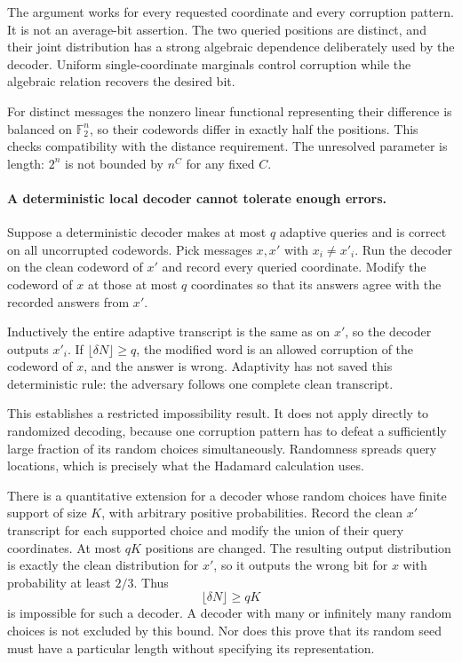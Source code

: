 \documentclass[11pt]{article}
\begin{document}
The argument works for every requested coordinate and every corruption pattern. It is not an average-bit assertion. The two queried positions are distinct, and their joint distribution has a strong algebraic dependence deliberately used by the decoder. Uniform single-coordinate marginals control corruption while the algebraic relation recovers the desired bit.

For distinct messages the nonzero linear functional representing their difference is balanced on $\mathbb F_2^n$, so their codewords differ in exactly half the positions. This checks compatibility with the distance requirement. The unresolved parameter is length: $2^n$ is not bounded by $n^C$ for any fixed $C$.

\paragraph{A deterministic local decoder cannot tolerate enough errors.}
Suppose a deterministic decoder makes at most $q$ adaptive queries and is correct on all uncorrupted codewords. Pick messages $x,x'$ with $x_i\ne x'_i$. Run the decoder on the clean codeword of $x'$ and record every queried coordinate. Modify the codeword of $x$ at those at most $q$ coordinates so that its answers agree with the recorded answers from $x'$.

Inductively the entire adaptive transcript is the same as on $x'$, so the decoder outputs $x'_i$. If $\lfloor\delta N\rfloor\ge q$, the modified word is an allowed corruption of the codeword of $x$, and the answer is wrong. Adaptivity has not saved this deterministic rule: the adversary follows one complete clean transcript.

This establishes a restricted impossibility result. It does not apply directly to randomized decoding, because one corruption pattern has to defeat a sufficiently large fraction of its random choices simultaneously. Randomness spreads query locations, which is precisely what the Hadamard calculation uses.

There is a quantitative extension for a decoder whose random choices have finite support of size $K$, with arbitrary positive probabilities. Record the clean $x'$ transcript for each supported choice and modify the union of their query coordinates. At most $qK$ positions are changed. The resulting output distribution is exactly the clean distribution for $x'$, so it outputs the wrong bit for $x$ with probability at least $2/3$. Thus
\[
 \lfloor\delta N\rfloor\ge qK
\]
is impossible for such a decoder. A decoder with many or infinitely many random choices is not excluded by this bound. Nor does this prove that its random seed must have a particular length without specifying its representation.
\end{document}
